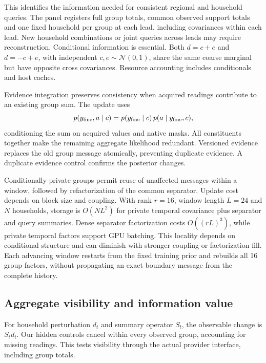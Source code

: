 \documentclass[conference]{IEEEtran}
\begin{document}
This identifies the information needed for consistent regional and household queries. The panel registers full group totals, common observed support totals and one fixed household per group at each lead, including covariances within each lead. New household combinations or joint queries across leads may require reconstruction. Conditional information is essential. Both $d=c+e$ and $d=-c+e$, with independent $c,e\sim\mathcal N(0,1)$, share the same coarse marginal but have opposite cross covariances. Resource accounting includes conditionals and host caches.

Evidence integration preserves consistency when acquired readings contribute to an existing group sum. The update uses
\begin{equation}
p(y_{\rm fine},a\mid c)
=p(y_{\rm fine}\mid c)\,p(a\mid y_{\rm fine},c),\label{eq:replace}
\end{equation}
conditioning the sum on acquired values and native masks. All constituents together make the remaining aggregate likelihood redundant. Versioned evidence replaces the old group message atomically, preventing duplicate evidence. A duplicate evidence control confirms the posterior changes.

Conditionally private groups permit reuse of unaffected messages within a window, followed by refactorization of the common separator. Update cost depends on block size and coupling. With rank $r=16$, window length $L=24$ and $N$ households, storage is $O(NL^2)$ for private temporal covariance plus separator and query summaries. Dense separator factorization costs $O((rL)^3)$, while private temporal factors support GPU batching. This locality depends on conditional structure and can diminish with stronger coupling or factorization fill. Each advancing window restarts from the fixed training prior and rebuilds all 16 group factors, without propagating an exact boundary message from the complete history.







\subsection{Aggregate visibility and information value}
For household perturbation $d_t$ and summary operator $S_t$, the observable change is $S_t d_t$. Our hidden controls cancel within every observed group, accounting for missing readings. This tests visibility through the actual provider interface, including group totals.
\end{document}
